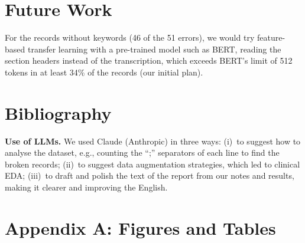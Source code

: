 \documentclass[twocolumn,10pt]{article}
\begin{document}
\section{Future Work}
\label{sec:future}

For the records without keywords (46 of the 51 errors), we would try feature-based transfer learning with a pre-trained model such as BERT, reading the section headers instead of the transcription, which exceeds BERT's limit of 512 tokens in at least 34\% of the records (our initial plan).

\clearpage                                      %
\section*{Bibliography}
\noindent\textbf{Use of LLMs.} We used Claude (Anthropic) in three ways: (i)~to suggest how to analyse the dataset, e.g., counting the ``;'' separators of each line to find the broken records; (ii)~to suggest data augmentation strategies, which led to clinical \acs{EDA}; (iii)~to draft and polish the text of the report from our notes and results, making it clearer and improving the English.




\appendix
\setcounter{figure}{0}
\renewcommand{\thefigure}{A\arabic{figure}}
\setcounter{table}{0}
\renewcommand{\thetable}{A\arabic{table}}

\section*{Appendix A: Figures and Tables}
\end{document}
